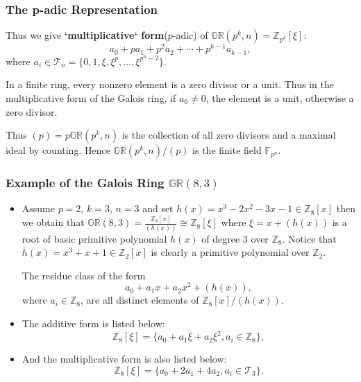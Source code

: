 \documentclass[
    aspectratio=169,                   %
]{beamer}
\renewcommand{\Bbb}{\mathbb}
\newcommand{\Z}{\mathbb{Z}}
\newcommand{\GR}{\mathbb{GR}}
\newcommand{\F}{\mathbb{F}}
\begin{document}
\begin{frame}
    \frametitle{The p-adic Representation}

    Thus we give \textbf{`multiplicative` form}($ p $-adic) of $\GR(p^k,n)=\Z_{p^k}[\xi]$:
    \begin{equation}\label{multiplication_form}
        a_0+pa_1+p^2a_2+\cdots+p^{k-1}a_{k-1},
    \end{equation}
    where $a_i\in\mathcal{T}_n=\{0,1,\xi,\xi^p,\dots,\xi^{p^n-2}\}$.

    \begin{remark}
        In a finite ring, every nonzero element is a zero divisor or a unit. 
        Thus in the multiplicative form of the Galois ring, if $ a_0\neq 0 $, the element is a unit, 
        otherwise a zero divisor.
    \end{remark}

    Thus $ (p) =p\GR(p^k,n) $ is the collection of all zero divisors and a maximal ideal by counting.
     Hence $ \GR(p^k,n)/(p)$ is the finite field $ \F_{p^n} $. 
\end{frame}

\begin{frame}
    \frametitle{Example of the Galois Ring $ \GR(8,3) $}
    \begin{itemize}
        
        \item Assume $ p=2 $, $ k=3 $, $ n=3 $ and set $ h(x)=x^3-2x^2-3x-1\in\Bbb{Z}_8[x] $ then we obtain that $\GR(8,3)=\frac{\Bbb Z_8[x]}{(h(x)) }\cong\Bbb Z_8[\xi]$ where $ \xi=x+(h(x))  $ is a root of basic primitive polynomial $ h(x) $ of degree $ 3 $ over $ \Bbb Z_8 $. Notice that $ \overline{h}(x)=x^3+x+1\in\Bbb Z_2[x] $ is clearly a primitive polynomial over $ \Bbb Z_2 $.
        
        The residue class of the form
        \[a_0+a_1x+a_2x^2+(h(x)), \]
        where $ a_i\in\Bbb Z_8 $, are all distinct elements of $ \Bbb Z_8[x]/(h(x))  $.
        
        \item The additive form is listed below:
        \[\Bbb Z_8[\xi]=\{ a_0+a_1\xi+a_2\xi^2,a_i\in\Bbb Z_8 \},\]
        \item And the multiplicative form is also listed below:
        \[\Bbb Z_8[\xi]=\{a_0+2a_1+4a_2,a_i\in\mathcal{T}_3\}.\]
        
    \end{itemize}
    \end{frame}
\end{document}
